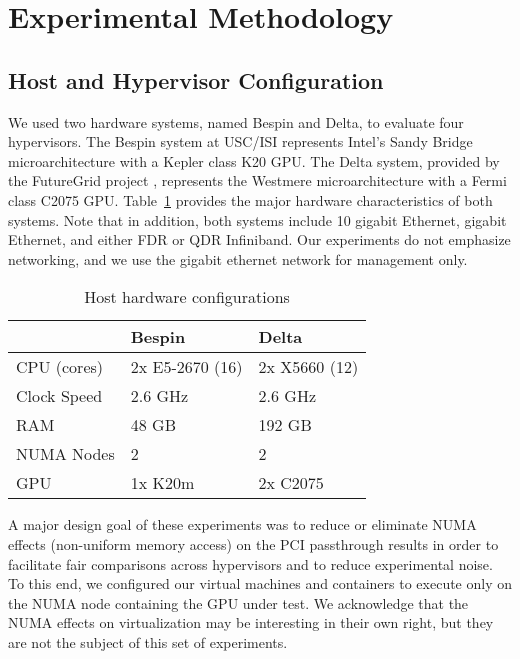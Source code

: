 \section{Experimental Methodology}\label{METHOD}


\subsection{Host and Hypervisor Configuration}

We used two hardware systems, named Bespin and Delta, to evaluate four
hypervisors.
The Bespin system at USC/ISI represents Intel's Sandy Bridge microarchitecture with a Kepler class K20 GPU. The Delta system, provided by the FutureGrid project \cite{www-futuregrid}, represents the Westmere microarchitecture with a Fermi class C2075 GPU. 
Table~\ref{HOSTS} provides
the major hardware characteristics of both systems.  Note that in addition, both
systems include 10 gigabit Ethernet, gigabit Ethernet, and either FDR or QDR
Infiniband. Our experiments do not emphasize networking, and we use the gigabit
ethernet network for management only.


\begin{table}
\small
\renewcommand{\arraystretch}{1.3}
\caption{Host hardware configurations}
\label{HOSTS}
\centering
\begin{tabular}{|l||l|l|}
\hline
 & Bespin & Delta  \\ \hline
CPU (cores)  & 2x E5-2670 (16)  & 2x X5660 (12) \\ \hline
Clock Speed & 2.6 GHz & 2.6 GHz \\ \hline 
RAM &  48 GB &  192 GB \\ \hline
NUMA Nodes & 2 & 2 \\ \hline
GPU &  1x K20m &  2x C2075 \\ \hline

\end{tabular}
\end{table}

A major design goal of these experiments was to reduce or eliminate NUMA effects
(non-uniform memory access) on the PCI passthrough results in order to
facilitate fair comparisons across hypervisors and to reduce experimental noise.  To this end, we
configured our virtual machines and containers to execute only on the NUMA node
containing the GPU under test.  We acknowledge that the NUMA effects on
virtualization may be interesting in their own right, but they are not the
subject of this set of experiments.

